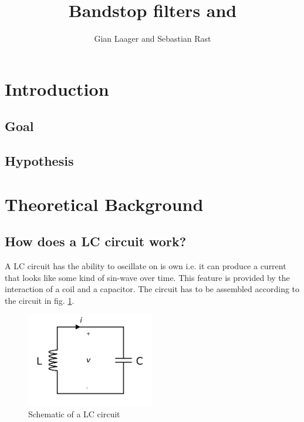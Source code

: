 \documentclass{article}
\title{Bandstop filters and }
\author{Gian Laager and Sebastian Rast}
\begin{document}
\maketitle

\section{Introduction}

\subsection{Goal}
\subsection{Hypothesis}

\section{Theoretical Background}
\subsection{How does a LC circuit work?}
A LC circuit has the ability to oscillate on is own i.e. it can produce a current that looks like some kind of sin-wave over time. This feature is provided by the interaction of a coil and a capacitor. The circuit has to be assembled according to the circuit in fig. \ref{fig:lc}.

\begin{figure}[!ht]
    \centering
    \includegraphics[width=0.5\textwidth]{images/2560px-LC_parallel_simple.svg.png}
    \caption{Schematic of a LC circuit}
    \label{fig:lc}
\end{figure}
\end{document}
